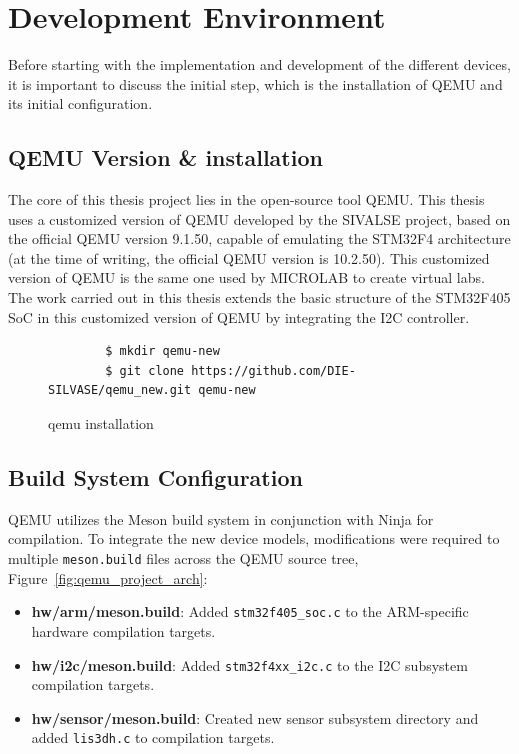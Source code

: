 \section{Development Environment}
\label{sec:impl_environment}

Before starting with the implementation and development of the different devices, it is important to discuss the initial step, which is the installation of QEMU and its initial configuration.

\subsection{QEMU Version \& installation}

The core of this thesis project lies in the open-source tool QEMU. This thesis uses a customized version of QEMU developed by the SIVALSE project, based on the official QEMU version 9.1.50, capable of emulating the STM32F4 architecture (at the time of writing, the official QEMU version is 10.2.50). This customized version of QEMU is the same one used by MICROLAB to create virtual labs. The work carried out in this thesis extends the basic structure of the STM32F405 SoC in this customized version of QEMU by integrating the I2C controller.

\begin{figure}[H]
    \centering
    \begin{verbatim}
        $ mkdir qemu-new
        $ git clone https://github.com/DIE-SILVASE/qemu_new.git qemu-new
    \end{verbatim}

    \caption{qemu installation}
    \label{fig:qemu_installation}
\end{figure}


\subsection{Build System Configuration}

QEMU utilizes the Meson build system in conjunction with Ninja for compilation. To integrate the new device models, modifications were required to multiple \texttt{meson.build} files across the QEMU source tree, 
Figure~\ref{fig:qemu_project_arch}:

\begin{itemize}
    \item \textbf{hw/arm/meson.build}:      Added \texttt{stm32f405\_soc.c} to the ARM-specific hardware compilation targets.
    \item \textbf{hw/i2c/meson.build}:      Added \texttt{stm32f4xx\_i2c.c} to the I2C subsystem compilation targets.
    \item \textbf{hw/sensor/meson.build}:   Created new sensor subsystem directory and \\ added \texttt{lis3dh.c} to compilation targets.
\end{itemize}

